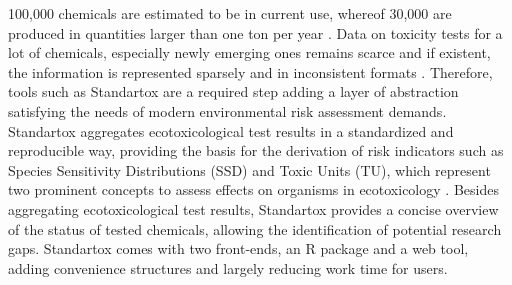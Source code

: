 100,000 chemicals are estimated to be in current use, whereof 30,000 are produced in quantities larger than one ton per year \citep{breithaupt_costs_2006}. Data on toxicity tests for a lot of chemicals, especially newly emerging ones remains scarce and if existent, the information is represented sparsely and in inconsistent formats \citep{gessner_fostering_2016}. Therefore, tools such as Standartox are a required step adding a layer of abstraction satisfying the needs of modern environmental risk assessment demands. Standartox aggregates ecotoxicological test results in a standardized and reproducible way, providing the basis for the derivation of risk indicators such as Species Sensitivity Distributions (SSD) \citep{posthuma_species_2002} and Toxic Units (TU), which represent two prominent concepts to assess effects on organisms in ecotoxicology \citep{kefford_definition_2011, schafer_effects_2011}. Besides aggregating ecotoxicological test results, Standartox provides a concise overview of the status of tested chemicals, allowing the identification of potential research gaps. Standartox comes with two front-ends, an R \citep{rcoreteam_language_2017} package and a web tool, adding convenience structures and largely reducing work time for users.

\iffalse



Curently \citep{schafer_future_2019} 

include \citep{yamamuro_neonicotinoids_2019} and \citep{seibold_arthropod_2019} as a new prominent examples for effects on the ecosystem


    \item standardized toxicity values
    
    \item reproducible
    
    \item time saving
\fi    

\iffalse

